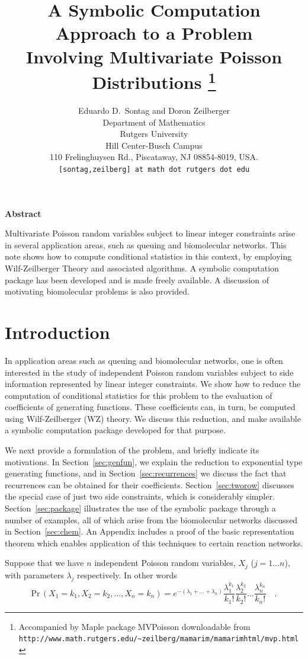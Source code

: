 \documentclass[11pt]{article}
\title{A Symbolic Computation Approach to a Problem\\
Involving Multivariate Poisson Distributions%
\footnote{%
Accompanied by Maple package {MVPoisson}
downloadable from 
\hfill\break
{\tt http://www.math.rutgers.edu/\~{}zeilberg/mamarim/mamarimhtml/mvp.html} }}
\author{Eduardo D.\ Sontag and Doron Zeilberger\\
Department of Mathematics\\
Rutgers University\\
Hill Center-Busch Campus\\
110 Frelinghuysen Rd., Piscataway, NJ 08854-8019, USA.\\
{\tt [sontag,zeilberg]  at math dot rutgers dot edu}}
\newcommand{\Prob}{\mbox{Pr}\,}
\begin{document}
\maketitle

\begin{center}
{\bf Abstract}
\end{center}

Multivariate Poisson random variables subject to linear integer constraints
arise in several application areas, such as queuing and biomolecular networks.
This note shows how to compute conditional statistics in this context,
by employing Wilf-Zeilberger 
Theory and associated algorithms.  A symbolic computation
package has been developed and is made freely available.  A discussion of
motivating biomolecular problems is also provided.

\section{Introduction}

In application areas such as queuing and biomolecular networks, one is often
interested in the study of independent Poisson random variables subject to side
information represented by linear integer constraints.  We show how to reduce
the computation of conditional statistics for this problem to the evaluation
of coefficients of generating functions. These
coefficients can, in turn, be computed using Wilf-Zeilberger (WZ) theory.  We
discuss this reduction, and make available a symbolic computation package
developed for that purpose.

We next provide a formulation of the problem, and briefly indicate its
motivations.  In Section~\ref{sec:genfun}, we explain the reduction to
exponential type generating functions, and in Section~\ref{sec:recurrences} we
discuss the fact that recurrences can be obtained for their coefficients.
Section~\ref{sec:tworow} discusses the special case of just two side
constraints, which is considerably simpler.
Section~\ref{sec:package} illustrates the use of the symbolic package
through a number of examples, all of which arise from the biomolecular
networks discussed in Section~\ref{sec:chem}.
An Appendix includes a proof of the basic representation theorem which
enables application of this techniques to certain reaction networks.

Suppose that we have $n$ independent Poisson random variables, $X_j$ 
($j=1 \ldots  n$), with parameters
$\lambda _j$ respectively. In other words
\begin{equation}
\label{eq:P1}
\Prob(X_1=k_1, X_2=k_2, \ldots  , X_n=k_n)=
e^{-(\lambda _1 + \ldots  + \lambda _n)}
\frac{\lambda _1^{k_1}}{k_1!}\frac{\lambda _2^{k_2}}{k_2!}
\ldots   \frac{\lambda _n^{k_n}}{k_n!} \quad .
\end{equation}
\end{document}
